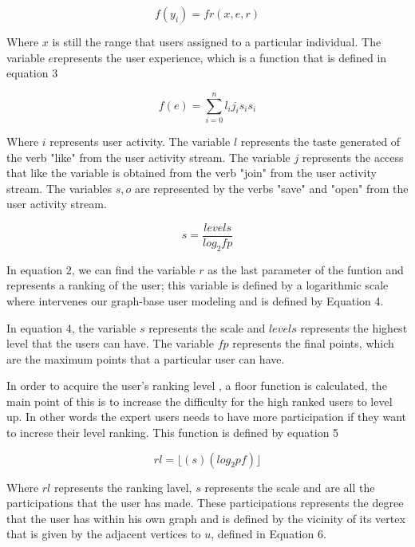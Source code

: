 \begin{equation}\label{eq:centerM}
\displaystyle f(y_i)= fr(x, e, r)
\end{equation}

Where $x$ is still the range that users assigned to a particular individual. The variable $e$represents the user experience, which is a function that is defined in equation 3

\begin{equation}\label{eq:centerM}
\displaystyle f(e) = \sum_{i=0}^{n}l_{i}j_{i}s_{i}s_{i}
\end{equation}

Where $i$ represents user activity. The variable $l$ represents the taste generated of the verb "like" from the user activity stream.
The variable  $j$ represents the access that like the variable  is obtained from the verb "join" from the user activity stream. The variables $s, o$ are represented by the verbs "save" and "open" from the user activity stream.

\begin{equation}\label{eq:centerM}
\displaystyle s =\frac{levels}{log_{2}fp}
\end{equation}

In equation 2, we can find the variable $r$ as the last parameter of the funtion and represents a ranking of the user; this variable is defined by a logarithmic scale where intervenes our graph-base user modeling  and is defined by Equation 4.

In equation 4, the variable $s$ represents the scale and $levels$ represents the highest level that the users can have. The variable $fp$ represents the final points, which are the maximum points that a particular user can have.

In order to acquire the user's ranking level , a floor function  is calculated, the main point of this is to increase the difficulty for the high ranked users to level up. In other words the expert users needs to have more participation if they want to increse their level ranking. This function is defined by equation 5

\begin{equation}\label{eq:centerM}
\displaystyle rl=\lfloor(s)(log_2pf)\rfloor
\end{equation}

Where $rl$ represents the ranking lavel, $s$ represents the scale and  are all the participations  that the user has made. These participations represents the degree that the user has within his own graph and is defined by the vicinity of its vertex  that is given by the adjacent vertices to $u$, defined in Equation 6.

